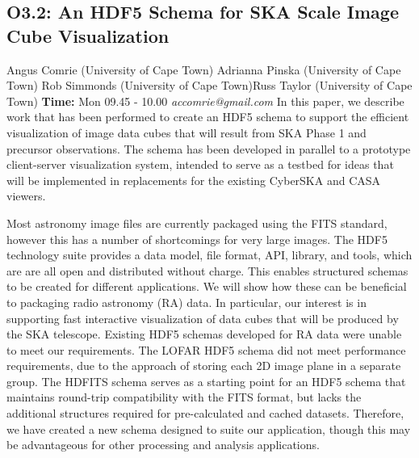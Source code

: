 \documentclass{report}
\begin{document}
\subsection*{O3.2: An HDF5 Schema for SKA Scale Image Cube Visualization}
\bigskip
Angus Comrie (University of Cape Town) \newline Adrianna Pinska (University of Cape Town) \newline  Rob Simmonds (University of Cape Town)\newline  Russ Taylor (University of Cape Town)\newline  \newline  \newline\newline
{\bf Time:} Mon 09.45 - 10.00\newline
\newline
{\it accomrie@gmail.com}\newline
\newline\newline
In this paper, we describe work that has been performed to create an HDF5 schema to support the efficient visualization of image data cubes that will result from SKA Phase 1 and precursor observations. The schema has been developed in parallel to a prototype client-server visualization system, intended to serve as a testbed for ideas that will be implemented in replacements for the existing CyberSKA and CASA viewers.

Most astronomy image files are currently packaged using the FITS standard, however this has a number of shortcomings for very large images. The HDF5 technology suite provides a data model, file format, API, library, and tools, which are are all open and distributed without charge. This enables structured schemas to be created for different applications. We will show how these can be beneficial to packaging radio astronomy (RA) data. In particular, our interest is in supporting fast interactive visualization of data cubes that will be produced by the SKA telescope. Existing HDF5 schemas developed for RA data were unable to meet our requirements. The LOFAR HDF5 schema did not meet performance requirements, due to the approach of storing each 2D image plane in a separate group. The HDFITS schema serves as a starting point for an HDF5 schema that maintains round-trip compatibility with the FITS format, but lacks the additional structures required for pre-calculated and cached datasets. Therefore, we have created a new schema designed to suite our application, though this may be advantageous for other processing and analysis applications. 
\end{document}
